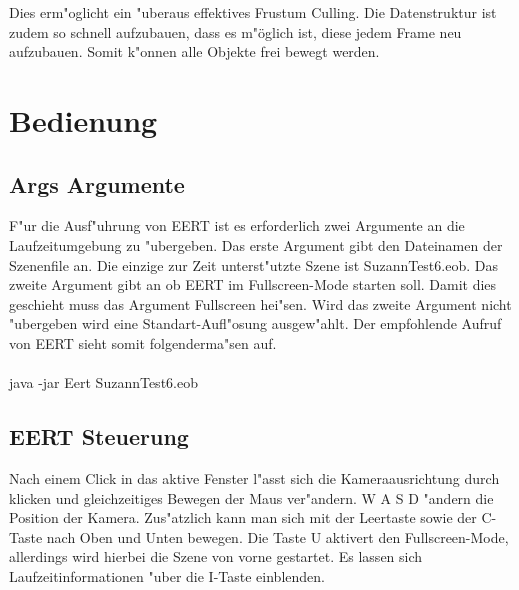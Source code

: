 \documentclass[a4paper,titlepage]{article}
\begin{document}
Dies erm"oglicht ein "uberaus effektives Frustum Culling. Die Datenstruktur ist zudem so schnell aufzubauen, 
dass es m"öglich ist, diese jedem Frame neu aufzubauen. Somit k"onnen alle Objekte frei bewegt werden.

\section{Bedienung}
\subsection{Args Argumente}
F"ur die Ausf"uhrung von EERT ist es erforderlich zwei Argumente an die Laufzeitumgebung zu "ubergeben. 
Das erste Argument gibt den Dateinamen der Szenenfile an. Die einzige zur Zeit unterst"utzte Szene ist 
SuzannTest6.eob. Das zweite Argument gibt an ob EERT im Fullscreen-Mode starten soll. Damit dies geschieht 
muss das Argument Fullscreen hei"sen. Wird das zweite Argument nicht "ubergeben wird eine Standart-Aufl"osung 
ausgew"ahlt. Der empfohlende Aufruf von EERT sieht somit folgenderma"sen auf.\\\\ java -jar Eert SuzannTest6.eob

\subsection{EERT Steuerung}
Nach einem Click in das aktive Fenster l"asst sich die Kameraausrichtung durch klicken und gleichzeitiges 
Bewegen der Maus ver"andern. W A S D "andern die Position der Kamera. Zus"atzlich kann man sich mit der 
Leertaste sowie der C-Taste nach Oben und Unten bewegen. Die Taste U aktivert den Fullscreen-Mode, allerdings 
wird hierbei die Szene von vorne gestartet. Es lassen sich Laufzeitinformationen "uber die I-Taste einblenden.
\end{document}
